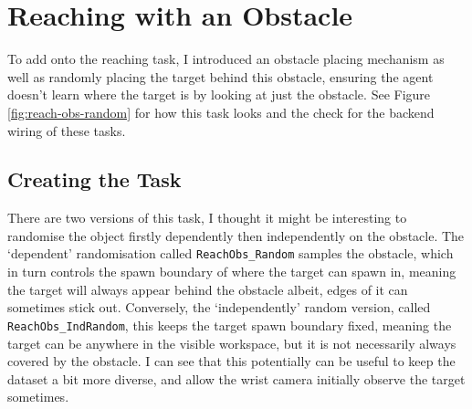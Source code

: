 \section{Reaching with an Obstacle}
To add onto the reaching task, I introduced an obstacle placing mechanism as well as randomly placing the target behind this obstacle, ensuring the agent doesn't learn where the target is by looking at just the obstacle. See Figure \ref{fig:reach-obs-random} for how this task looks and the check  for the backend wiring of these tasks.

\subsection{Creating the Task}

There are two versions of this task, I thought it might be interesting to randomise the object firstly dependently then independently on the obstacle. The `dependent' randomisation called \verb|ReachObs_Random| samples the obstacle, which in turn controls the spawn boundary of where the target can spawn in, meaning the target will always appear behind the obstacle albeit, edges of it can sometimes stick out. Conversely, the `independently' random version, called \verb|ReachObs_IndRandom|, this keeps the target spawn boundary fixed, meaning the target can be anywhere in the visible workspace, but it is not necessarily always covered by the obstacle. I can see that this potentially can be useful to keep the dataset a bit more diverse, and allow the wrist camera initially observe the target sometimes.

